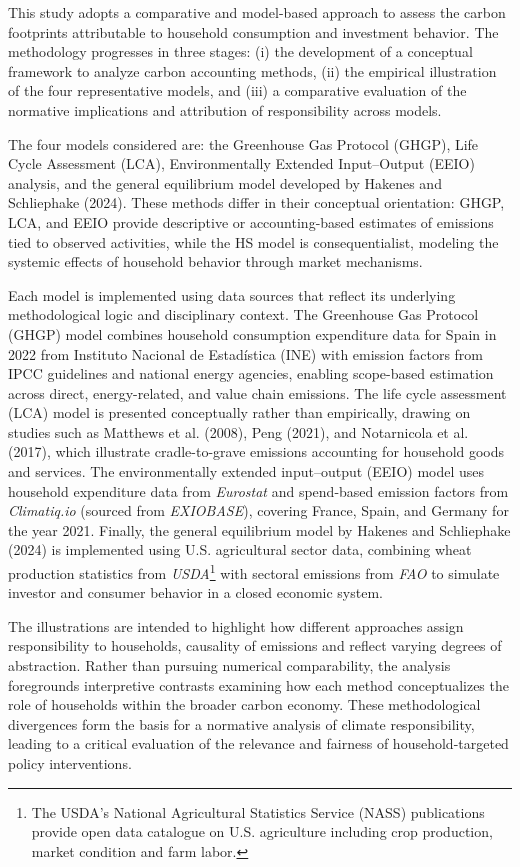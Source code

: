 \documentclass[12pt,a4paper]{article}%
\begin{document}
This study adopts a comparative and model-based approach to assess the carbon footprints attributable to household consumption and investment behavior. The methodology progresses in three stages: (i) the development of a conceptual framework to analyze carbon accounting methods, (ii) the empirical illustration of the four representative models, and (iii) a comparative evaluation of the normative implications and attribution of responsibility across models. 

The four models considered are: the Greenhouse Gas Protocol (GHGP), Life Cycle Assessment (LCA), Environmentally Extended Input–Output (EEIO) analysis, and the general equilibrium model developed by Hakenes and Schliephake (2024). These methods differ in their conceptual orientation: GHGP, LCA, and EEIO provide descriptive or accounting-based estimates of emissions tied to observed activities, while the HS model is consequentialist, modeling the systemic effects of household behavior through market mechanisms. 

Each model is implemented using data sources that reflect its underlying methodological logic and disciplinary context. The Greenhouse Gas Protocol (GHGP) model combines household consumption expenditure data for Spain in 2022 from Instituto Nacional de Estadística (INE) with emission factors from IPCC guidelines and national energy agencies, enabling scope-based estimation across direct, energy-related, and value chain emissions. The life cycle assessment (LCA) model is presented conceptually rather than empirically, drawing on studies such as Matthews et al. (2008), Peng (2021), and Notarnicola et al. (2017), which illustrate cradle-to-grave emissions accounting for household goods and services. The environmentally extended input--output (EEIO) model uses household expenditure data from \textit{Eurostat} and spend-based emission factors from \textit{Climatiq.io} (sourced from \textit{EXIOBASE}), covering France, Spain, and Germany for the year 2021. Finally, the general equilibrium model by Hakenes and Schliephake (2024) is implemented using U.S. agricultural sector data, combining wheat production statistics from \textit{USDA}\footnote{The USDA's National Agricultural Statistics Service (NASS) publications provide open data catalogue on U.S. agriculture including crop production, market condition and farm labor.} with sectoral emissions from \textit{FAO} to simulate investor and consumer behavior in a closed economic system. 

The illustrations are intended to highlight how different approaches assign responsibility to households, causality of emissions and reflect varying degrees of abstraction. Rather than pursuing numerical comparability, the analysis foregrounds interpretive contrasts examining how each method conceptualizes the role of households within the broader carbon economy. These methodological divergences form the basis for a normative analysis of climate responsibility, leading to a critical evaluation of the relevance and fairness of household-targeted policy interventions.
\end{document}
